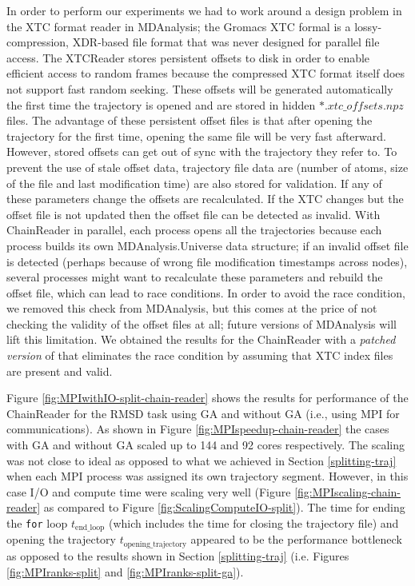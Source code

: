 In order to perform our experiments we had to work around a design problem in the XTC format reader in MDAnalysis; the Gromacs XTC formal is a lossy-compression, XDR-based file format that was never designed for parallel file access.
The XTCReader stores persistent offsets to disk \citep{Gowers:2016aa} in order to enable efficient access to random frames because the compressed XTC format itself does not support fast random seeking.
These offsets will be generated automatically the first time the trajectory is opened and are stored in hidden $\ast.xtc\_offsets.npz$ files. 
The advantage of these persistent offset files is that after opening the trajectory for the first time, opening the same file will be very fast afterward. 
However, stored offsets can get out of sync with the trajectory they refer to. 
To prevent the use of stale offset data, trajectory file data are (number of atoms, size of the file and last modification time) are also stored for validation.
If any of these parameters change the offsets are recalculated. 
If the XTC changes but the offset file is not updated then the offset file can be detected as invalid.
With ChainReader in parallel, each process opens all the trajectories because each process builds its own MDAnalysis.Universe data structure; if an invalid offset file is detected (perhaps because of wrong file modification timestamps across nodes), several processes might want to recalculate these parameters and rebuild the offset file, which can lead to race conditions.
In order to avoid the race condition, we removed this check from MDAnalysis, but this comes at the price of not checking the validity of the offset files at all; future versions of MDAnalysis will lift this limitation.  
We obtained the results for the ChainReader with a \emph{patched version} of  that eliminates the race condition by assuming that XTC index files are present and valid.

Figure \ref{fig:MPIwithIO-split-chain-reader} shows the results for performance of the ChainReader for the RMSD task using GA and without GA (i.e., using MPI for communications). 
As shown in Figure \ref{fig:MPIspeedup-chain-reader} the cases with GA and without GA scaled up to 144 and 92 cores respectively.
The scaling was not close to ideal as opposed to what we achieved in Section \ref{splitting-traj} when each MPI process was assigned its own trajectory segment. 
However, in this case I/O and compute time were scaling very well (Figure \ref{fig:MPIscaling-chain-reader} as compared to Figure \ref{fig:ScalingComputeIO-split}).
The time for ending the \texttt{for} loop $t_{\text{end\_loop}}$ (which includes the time for closing the trajectory file) and opening the trajectory $t_{\text{opening\_trajectory}}$ appeared to be the performance bottleneck as opposed to the results shown in Section \ref{splitting-traj} (i.e. Figures \ref{fig:MPIranks-split} and \ref{fig:MPIranks-split-ga}). 

